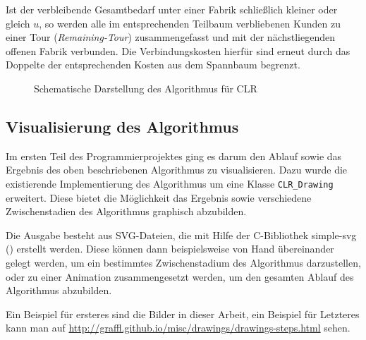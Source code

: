 \documentclass[a4paper,ngerman,11pt,bibtotoc]{scrartcl}
\theoremstyle{definition}
\theoremstyle{plain}
\theoremstyle{remark}
\def\Cpp{{C\nolinebreak[4]\hspace{-.05em}\raisebox{.4ex}{\tiny\bf ++}}}
\begin{document}
\begin{description}
	Ist der verbleibende Gesamtbedarf unter einer Fabrik schließlich kleiner oder gleich $u$, so werden alle im entsprechenden Teilbaum verbliebenen Kunden zu einer Tour (\emph{Remaining-Tour}) zusammengefasst und mit der nächstliegenden offenen Fabrik verbunden. Die Verbindungskosten hierfür sind erneut durch das Doppelte der entsprechenden Kosten aus dem Spannbaum begrenzt.
\end{description}

\begin{figure}[H]
	\begin{tiny}
		
	\end{tiny}
	\caption{Schematische Darstellung des Algorithmus für CLR}\label{fig:CLRAlg}
\end{figure}

\subsection{Visualisierung des Algorithmus}

Im ersten Teil des Programmierprojektes ging es darum den Ablauf sowie das Ergebnis des oben beschriebenen Algorithmus zu visualisieren. Dazu wurde die existierende Implementierung des Algorithmus um eine Klasse \lstinline|CLR_Drawing| erweitert. Diese bietet die Möglichkeit das Ergebnis sowie verschiedene Zwischenstadien des Algorithmus graphisch abzubilden. 

Die Ausgabe besteht aus SVG-Dateien, die mit Hilfe der \Cpp-Bibliothek simple-svg (\cite{simple-svg}) erstellt werden. Diese können dann beispielsweise von Hand übereinander gelegt werden, um ein bestimmtes Zwischenstadium des Algorithmus darzustellen, oder zu einer Animation zusammengesetzt werden, um den gesamten Ablauf des Algorithmus abzubilden.

Ein Beispiel für ersteres sind die Bilder in dieser Arbeit, ein Beispiel für Letzteres kann man auf \url{http://graffl.github.io/misc/drawings/drawings-steps.html} sehen.
\end{document}
